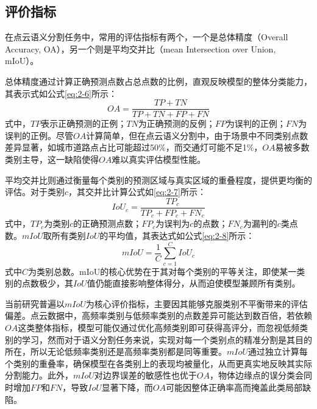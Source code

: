 \subsection{评价指标}
在点云语义分割任务中，常用的评估指标有两个，一个是总体精度（Overall Accuracy, OA），另一个则是平均交并比（mean Intersection over Union, mIoU）。

总体精度通过计算正确预测点数占总点数的比例，直观反映模型的整体分类能力，其表示式如公式\eqref{eq:2-6}所示：
\begin{equation}
    \label{eq:2-6}
    OA = \frac{TP + TN}{TP + TN + FP + FN}
\end{equation}
式中，$TP$表示正确预测的正例；$TN$为正确预测的反例；$FP$为误判的正例；$FN$为误判的正例。尽管$OA$计算简单，但在点云语义分割中，由于场景中不同类别点数差异显著，如城市道路点占比可能超过50\%，而交通灯可能不足1\%，$OA$易被多数类别主导，这一缺陷使得$OA$难以真实评估模型性能。

平均交并比则通过衡量每个类别的预测区域与真实区域的重叠程度，提供更均衡的评估。对于类别$c$，其交并比计算公式如\eqref{eq:2-7}所示：
\begin{equation}
    \label{eq:2-7}
    IoU_c = \frac{TP_c}{TP_c + FP_c + FN_c}
\end{equation}
式中，$TP_c$为类别$c$的正确预测点数；$FP_c$为误判为$c$的点数；$FN_c$为漏判的$c$类点数。$mIoU$取所有类别$IoU$的平均值，其表达式如公式\eqref{eq:2-8}所示：
\begin{equation}
    \label{eq:2-8}
    mIoU = \frac{1}{C} \sum_{c=1}^C IoU_c
\end{equation}
式中$C$为类别总数。mIoU的核心优势在于其对每个类别的平等关注，即使某一类别的点数极少，其$IoU$值仍能直接影响整体得分，从而迫使模型兼顾所有类别。

当前研究普遍以$mIoU$为核心评价指标，主要因其能够克服类别不平衡带来的评估偏差。点云数据中，高频率类别与低频率类别的点数差异可能达到数百倍，若依赖$OA$这类整体指标，模型可能仅通过优化高频类别即可获得高评分，而忽视低频类别的学习，然而对于语义分割任务来说，实现对每一个类别点的精准分割是其目的所在，所以无论低频率类别还是高频率类别都是同等重要。$mIoU$通过独立计算每个类别的重叠率，确保模型在各类别上的表现均被量化，从而更真实地反映其实际分割能力。此外，$mIoU$对边界误差的敏感性也优于$OA$，物体边缘点的误分类会同时增加$FP$和$FN$，导致$IoU$显著下降，而$OA$可能因整体正确率高而掩盖此类局部缺陷。%
